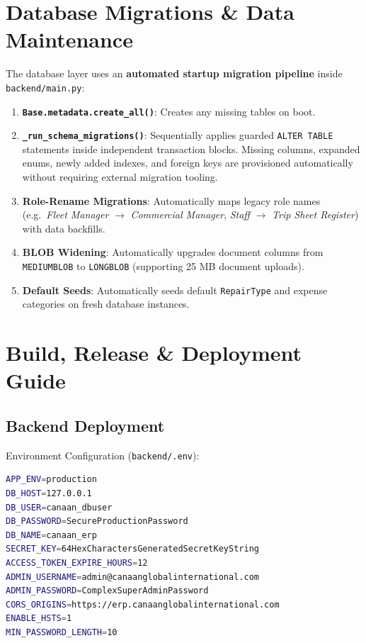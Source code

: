 \documentclass[11pt,a4paper]{article}
\begin{document}
\section{Database Migrations \& Data Maintenance}

The database layer uses an \textbf{automated startup migration pipeline} inside \texttt{backend/main.py}:
\begin{enumerate}[leftmargin=1.4em,itemsep=3pt]
  \item \textbf{\texttt{Base.metadata.create\_all()}}: Creates any missing tables on boot.
  \item \textbf{\texttt{\_run\_schema\_migrations()}}: Sequentially applies guarded \texttt{ALTER TABLE} statements inside independent transaction blocks. Missing columns, expanded enums, newly added indexes, and foreign keys are provisioned automatically without requiring external migration tooling.
  \item \textbf{Role-Rename Migrations}: Automatically maps legacy role names (e.g.\ \textit{Fleet Manager} $\rightarrow$ \textit{Commercial Manager}, \textit{Staff} $\rightarrow$ \textit{Trip Sheet Register}) with data backfills.
  \item \textbf{BLOB Widening}: Automatically upgrades document columns from \texttt{MEDIUMBLOB} to \texttt{LONGBLOB} (supporting 25 MB document uploads).
  \item \textbf{Default Seeds}: Automatically seeds default \texttt{RepairType} and expense categories on fresh database instances.
\end{enumerate}

\section{Build, Release \& Deployment Guide}

\subsection{Backend Deployment}
Environment Configuration (\texttt{backend/.env}):
\begin{lstlisting}[language=bash,style=canaancode]
APP_ENV=production
DB_HOST=127.0.0.1
DB_USER=canaan_dbuser
DB_PASSWORD=SecureProductionPassword
DB_NAME=canaan_erp
SECRET_KEY=64HexCharactersGeneratedSecretKeyString
ACCESS_TOKEN_EXPIRE_HOURS=12
ADMIN_USERNAME=admin@canaanglobalinternational.com
ADMIN_PASSWORD=ComplexSuperAdminPassword
CORS_ORIGINS=https://erp.canaanglobalinternational.com
ENABLE_HSTS=1
MIN_PASSWORD_LENGTH=10
\end{lstlisting}
\end{document}
